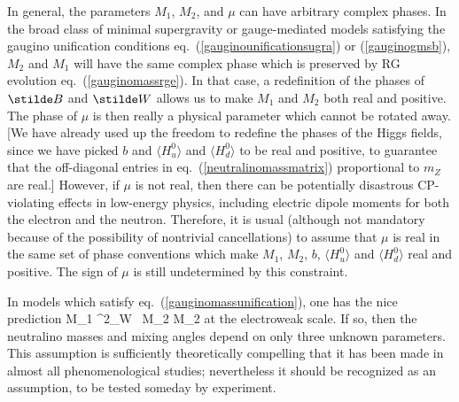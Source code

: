 In general, the parameters $M_1$, $M_2$, and $\mu$ can have
arbitrary complex phases.
In the broad class of minimal supergravity or gauge-mediated
models
satisfying the gaugino unification conditions
eq.~(\ref{gauginounificationsugra}) or (\ref{gauginogmsb}),
$M_2$ and $M_1$ will have the same complex phase which is preserved
by RG evolution eq.~(\ref{gauginomassrge}). In
that case, a
redefinition
of the phases of $\stilde B$ and $\stilde W$
allows us to make $M_1$ and $M_2$ both real and positive.
The phase of $\mu$ is then really a physical parameter which cannot be
rotated
away. [We have already
used up the freedom to redefine the phases of the Higgs fields, since
we have picked $b$ and $\langle H_u^0\rangle$ and $\langle H_d^0 \rangle$
to be real and positive, to guarantee that the off-diagonal
entries in eq.~(\ref{neutralinomassmatrix}) proportional to $m_Z$ are
real.]
However, if $\mu$ is not real, then there can be potentially disastrous
CP-violating effects in low-energy physics, including electric dipole
moments for both the electron and the neutron. Therefore, it is usual
(although not mandatory because of the possibility of nontrivial
cancellations) to
assume that $\mu$ is real
in the same set of phase conventions which make $M_1$, $M_2$,
$b$, $\langle H_u^0\rangle$ and $\langle H_d^0 \rangle$ real and positive.
The sign of $\mu$ is still undetermined by this constraint.

In models which satisfy eq.~(\ref{gauginomassunification}), one has the
nice prediction
\beq
M_1 \tan^2\theta_W \, M_2  M_2
\label{usualm1m2}
\eeq
at the electroweak scale.
If so, then the neutralino masses and mixing angles
depend on only three unknown parameters. This assumption is
sufficiently theoretically compelling that it has been made in almost all
phenomenological studies; nevertheless it should be recognized as an
assumption, to be tested someday by experiment.

